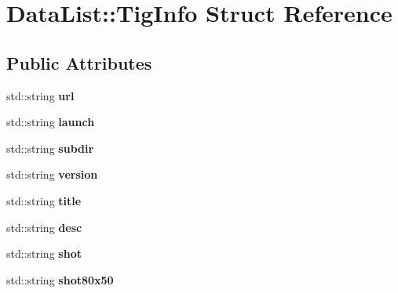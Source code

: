 \hypertarget{struct_data_list_1_1_tig_info}{\section{Data\-List\-:\-:Tig\-Info Struct Reference}
\label{struct_data_list_1_1_tig_info}
}
\subsection*{Public Attributes}
\begin{DoxyCompactItemize}
\item 
\hypertarget{struct_data_list_1_1_tig_info_acf42884c216fed475b5e34535b2d0409}{std\-::string {\bfseries url}}\label{struct_data_list_1_1_tig_info_acf42884c216fed475b5e34535b2d0409}

\item 
\hypertarget{struct_data_list_1_1_tig_info_ab46ca1de22a7ed5ffc17cf59b7acccdb}{std\-::string {\bfseries launch}}\label{struct_data_list_1_1_tig_info_ab46ca1de22a7ed5ffc17cf59b7acccdb}

\item 
\hypertarget{struct_data_list_1_1_tig_info_a9b38732f0b25e41ac91ceef71fe1d94d}{std\-::string {\bfseries subdir}}\label{struct_data_list_1_1_tig_info_a9b38732f0b25e41ac91ceef71fe1d94d}

\item 
\hypertarget{struct_data_list_1_1_tig_info_aa064346ea84e59511eb426559467167f}{std\-::string {\bfseries version}}\label{struct_data_list_1_1_tig_info_aa064346ea84e59511eb426559467167f}

\item 
\hypertarget{struct_data_list_1_1_tig_info_ab0eb73b0afb3223368664646fcc77957}{std\-::string {\bfseries title}}\label{struct_data_list_1_1_tig_info_ab0eb73b0afb3223368664646fcc77957}

\item 
\hypertarget{struct_data_list_1_1_tig_info_ad2a8b04726f4f3a51b67fc484eb703c8}{std\-::string {\bfseries desc}}\label{struct_data_list_1_1_tig_info_ad2a8b04726f4f3a51b67fc484eb703c8}

\item 
\hypertarget{struct_data_list_1_1_tig_info_aff8bb88265df399a024f6b32253465ed}{std\-::string {\bfseries shot}}\label{struct_data_list_1_1_tig_info_aff8bb88265df399a024f6b32253465ed}

\item 
\hypertarget{struct_data_list_1_1_tig_info_a822426126743eba0279b4d39ad6453cb}{std\-::string {\bfseries shot80x50}}\label{struct_data_list_1_1_tig_info_a822426126743eba0279b4d39ad6453cb}


\end{DoxyCompactItemize}
